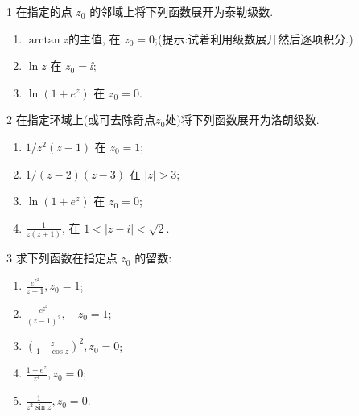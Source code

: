 \documentclass[11pt]{article}
\begin{document}
 

\begin{hwproblem}{1}
  在指定的点 $z_0$ 的邻域上将下列函数展开为泰勒级数.
  \begin{enumerate}
    \item $\arctan z$的主值, 在 $z_0=0$;(提示:试着利用级数展开然后逐项积分.)
    \item $\ln z$ 在 $z_0=\ii$;
    \item $\ln \left(1+e^z\right)$ 在 $z_0=0$.
  \end{enumerate}
\end{hwproblem}

\vspace{0.5cm}

\begin{hwproblem}{2}
  在指定环域上(或可去除奇点$z_0$处)将下列函数展开为洛朗级数.
  \begin{enumerate}
    \item$1 / z^2(z-1)$ 在 $z_0=1$;
    \item $1 /(z-2)(z-3)$ 在 $|z|>3$;
    \item $\ln \left(1+e^z\right)$ 在 $z_0=0$;
    \item $\frac{1}{z(z+1)}$, 在 $1<|z-i|<\sqrt{2}$.
  \end{enumerate}
\end{hwproblem}

\vspace{0.5cm}

\begin{hwproblem}{3}
 求下列函数在指定点 $z_0$ 的留数:

 \begin{enumerate}
  \item  $\frac{e^{z^2}}{z-1}, z_0=1$;
  \item $\frac{e^{z^2}}{(z-1)^2}, \quad z_0=1$;
  \item $\left(\frac{z}{1-\cos z}\right)^2, z_0=0$;
  \item  $\frac{1+e^z}{z^4}, z_0=0$;
  \item $\frac{1}{z^2 \sin z}, z_0=0$.
 \end{enumerate}

\end{hwproblem}
\end{document}
